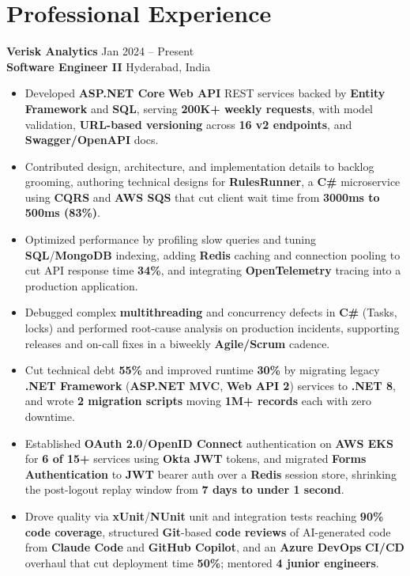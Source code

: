 \documentclass[a4paper,10pt]{article}
\begin{document}
\section*{Professional Experience}

\textbf{Verisk Analytics} \hfill Jan 2024 -- Present \\
\textbf{Software Engineer II} \hfill Hyderabad, India

\begin{itemize}[leftmargin=*]
    \item Developed \textbf{ASP.NET Core} \textbf{Web API} REST services backed by \textbf{Entity Framework} and \textbf{SQL}, serving \textbf{200K+ weekly requests}, with model validation, \textbf{URL-based versioning} across \textbf{16 v2 endpoints}, and \textbf{Swagger/OpenAPI} docs.
    \item Contributed design, architecture, and implementation details to backlog grooming, authoring technical designs for \textbf{RulesRunner}, a \textbf{C\#} microservice using \textbf{CQRS} and \textbf{AWS SQS} that cut client wait time from \textbf{3000ms to 500ms (83\%)}.
    \item Optimized performance by profiling slow queries and tuning \textbf{SQL}/\textbf{MongoDB} indexing, adding \textbf{Redis} caching and connection pooling to cut API response time \textbf{34\%}, and integrating \textbf{OpenTelemetry} tracing into a production application.
    \item Debugged complex \textbf{multithreading} and concurrency defects in \textbf{C\#} (Tasks, locks) and performed root-cause analysis on production incidents, supporting releases and on-call fixes in a biweekly \textbf{Agile/Scrum} cadence.
    \item Cut technical debt \textbf{55\%} and improved runtime \textbf{30\%} by migrating legacy \textbf{.NET Framework} (\textbf{ASP.NET MVC}, \textbf{Web API 2}) services to \textbf{.NET 8}, and wrote \textbf{2 migration scripts} moving \textbf{1M+ records} each with zero downtime.
    \item Established \textbf{OAuth 2.0}/\textbf{OpenID Connect} authentication on \textbf{AWS EKS} for \textbf{6 of 15+} services using \textbf{Okta} \textbf{JWT} tokens, and migrated \textbf{Forms Authentication} to \textbf{JWT} bearer auth over a \textbf{Redis} session store, shrinking the post-logout replay window from \textbf{7 days to under 1 second}.
    \item Drove quality via \textbf{xUnit}/\textbf{NUnit} unit and integration tests reaching \textbf{90\% code coverage}, structured \textbf{Git}-based \textbf{code reviews} of AI-generated code from \textbf{Claude Code} and \textbf{GitHub Copilot}, and an \textbf{Azure DevOps} \textbf{CI/CD} overhaul that cut deployment time \textbf{50\%}; mentored \textbf{4 junior engineers}.
\end{itemize}
\end{document}
